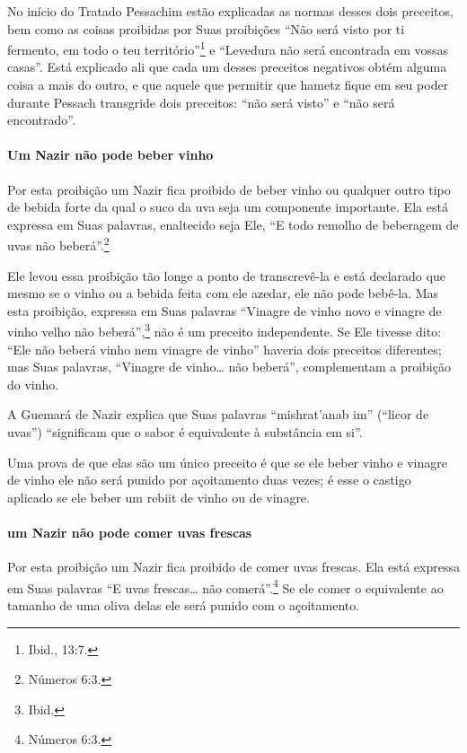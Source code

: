 No início do Tratado Pessachim estão explicadas as normas desses dois
preceitos, bem como as coisas proibidas por Suas proibições ``Não será
visto por ti fermento, em todo o teu território''\footnote{Ibid., 13:7.} e
``Levedura não será encontrada em vossas casas''. Está explicado ali que
cada um desses preceitos negativos obtém alguma coisa a mais do outro, e
que aquele que permitir que hametz fique em seu poder durante
Pessach transgride dois preceitos: ``não será visto'' e ``não será
encontrado''.

\paragraph{Um Nazir não pode beber vinho}

Por esta proibição um Nazir fica proibido de beber vinho ou qualquer
outro tipo de bebida forte da qual o suco da uva seja um componente
importante. Ela está expressa em Suas palavras, enaltecido seja Ele, ``E
todo remolho de beberagem de uvas não beberá''.\footnote{Números 6:3.}

Ele levou essa proibição tão longe a ponto de transcrevê-la e está
declarado que mesmo se o vinho ou a bebida feita com ele azedar, ele não
pode bebê-la. Mas esta proibição, expressa em Suas palavras ``Vinagre
de vinho novo e vinagre de vinho velho não beberá'',\footnote{Ibid.} não é um
preceito independente. Se Ele tivesse dito: ``Ele não beberá vinho nem
vinagre de vinho'' haveria dois preceitos diferentes; mas Suas
palavras, ``Vinagre de vinho\ldots{} não beberá'', complementam a proibição
do vinho.

A Guemará de Nazir explica que Suas palavras ``mishrat'anab im''
(``licor de uvas'') ``significam que o sabor é equivalente à substância
em si''.

Uma prova de que elas são um único preceito é que se ele beber vinho e
vinagre de vinho ele não será punido por açoitamento duas vezes; é esse
o castigo aplicado se ele beber um rebiit\starr{} de
vinho ou de vinagre.

\paragraph{um Nazir não pode comer uvas frescas}

Por esta proibição um Nazir fica proibido de comer uvas frescas. Ela
está expressa em Suas palavras ``E uvas frescas\ldots{} não comerá''.\footnote{Números 6:3.} Se ele comer o equivalente ao tamanho de uma oliva delas
ele será punido com o açoitamento.

